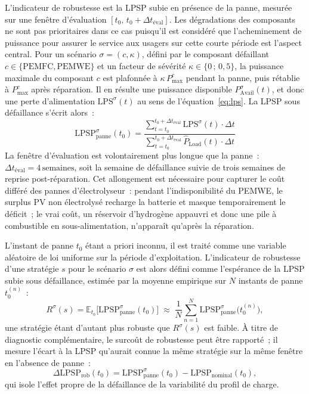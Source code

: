L'indicateur de robustesse est la LPSP subie en présence de la panne, mesurée sur une fenêtre d'évaluation $[t_0,\, t_0 + \Delta t_{\text{éval}}]$. Les dégradations des composants ne sont pas prioritaires dans ce cas puisqu'il est considéré que l'acheminement de puissance pour assurer le service aux usagers sur cette courte période est l'aspect central. Pour un scénario $\sigma = (c, \kappa)$, défini par le composant défaillant $c \in \{\text{PEMFC}, \text{PEMWE}\}$ et un facteur de sévérité $\kappa \in \{0\,;\,0{,}5\}$, la puissance maximale du composant $c$ est plafonnée à $\kappa\, P_{\text{max}}^{c}$ pendant la panne, puis rétablie à $P_{\text{max}}^{c}$ après réparation. Il en résulte une puissance disponible $P_{\text{Avail}}^{\sigma}(t)$, et donc une perte d'alimentation $\mathrm{LPS}^{\sigma}(t)$ au sens de l'équation~\eqref{eq:lps}. La LPSP sous défaillance s'écrit alors~:
\begin{equation}
    \mathrm{LPSP}_{\text{panne}}^{\sigma}(t_0) = \frac{\displaystyle\sum_{t=t_0}^{t_0+\Delta t_{\text{éval}}} \mathrm{LPS}^{\sigma}(t)\cdot \Delta t}{\displaystyle\sum_{t=t_0}^{t_0+\Delta t_{\text{éval}}} \hat{P}_{\text{Load}}(t)\cdot \Delta t}
    \label{eq:lpsp_panne}
\end{equation}
La fenêtre d'évaluation est volontairement plus longue que la panne~: $\Delta t_{\text{éval}} = 4\,\text{semaines}$, soit la semaine de défaillance suivie de trois semaines de reprise post-réparation. Cet allongement est nécessaire pour capturer le coût différé des pannes d'électrolyseur~: pendant l'indisponibilité du PEMWE, le surplus PV non électrolysé recharge la batterie et masque temporairement le déficit~; le vrai coût, un réservoir d'hydrogène appauvri et donc une pile à combustible en sous-alimentation, n'apparaît qu'après la réparation.

L'instant de panne $t_0$ étant a priori inconnu, il est traité comme une variable aléatoire de loi uniforme sur la période d'exploitation. L'indicateur de robustesse d'une stratégie $s$ pour le scénario $\sigma$ est alors défini comme l'espérance de la LPSP subie sous défaillance, estimée par la moyenne empirique sur $N$ instants de panne $t_0^{(n)}$~:
\begin{equation}
    R^{\sigma}(s) = \mathbb{E}_{t_0}\!\big[\mathrm{LPSP}_{\text{panne}}^{\sigma}(t_0)\big] \;\approx\; \frac{1}{N}\sum_{n=1}^{N} \mathrm{LPSP}_{\text{panne}}^{\sigma}\!\big(t_0^{(n)}\big),
    \label{eq:indic_robustesse}
\end{equation}
une stratégie étant d'autant plus robuste que $R^{\sigma}(s)$ est faible. À titre de diagnostic complémentaire, le surcoût de robustesse peut être rapporté~; il mesure l'écart à la LPSP qu'aurait connue la même stratégie sur la même fenêtre en l'absence de panne~:
\begin{equation}
    \Delta \mathrm{LPSP}_{\text{rob}}(t_0) = \mathrm{LPSP}_{\text{panne}}^{\sigma}(t_0) - \mathrm{LPSP}_{\text{nominal}}(t_0),
    \label{eq:surcout_robustesse}
\end{equation}
qui isole l'effet propre de la défaillance de la variabilité du profil de charge.


